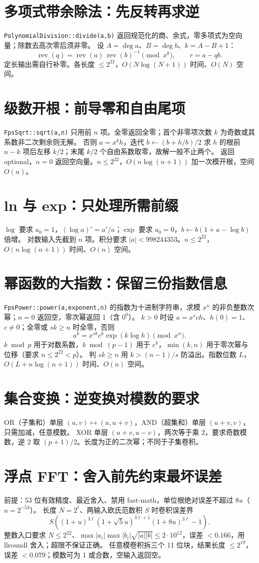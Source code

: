 \section{多项式带余除法：先反转再求逆}\label{knowledge-poly-division}
\texttt{PolynomialDivision::divide(a,b)} 返回规范化的商、余式，零多项式为空向量；除数去高次零后须非零。
设 $A=\deg a$、$B=\deg b$、$k=A-B+1$：
\[
 \operatorname{rev}(q)=\operatorname{rev}(a)\,
 \operatorname{rev}(b)^{-1}\pmod{x^k},\qquad r=a-qb.
\]
定长输出需自行补零。各长度 $\le2^{22}$，$O(N\log(N+1))$ 时间、$O(N)$ 空间。
\section{级数开根：前导零和自由尾项}\label{knowledge-poly-sqrt}
\texttt{FpsSqrt::sqrt(a,n)} 只用前 $n$ 项。全零返回全零；首个非零项次数 $k$ 为奇数或其系数非二次剩余则无解。
否则 $a=x^kh$，迭代 $b\gets(b+h/b)/2$ 求 $h$ 的根前 $n-k$ 项后左移 $k/2$；末尾 $k/2$ 个自由系数取零，故解一般不止两个。
返回 optional，$n=0$ 返回空向量。$n\le2^{22}$，$O(n\log(n+1))$ 加一次模开根，空间 $O(n)$。
\section{ln 与 exp：只处理所需前缀}\label{knowledge-poly-ln-exp}
$\log$ 要求 $a_0=1$，$(\log a)'=a'/a$；$\exp$ 要求 $a_0=0$，$b\gets b(1+a-\log b)$ 倍增。
对数输入先截到 $n$ 项。积分要求 $|a|<998244353$。$n\le2^{22}$，$O(n\log(n+1))$ 时间、$O(n)$ 空间。
\section{幂函数的大指数：保留三份指数信息}\label{knowledge-poly-power}
\texttt{FpsPower::power(a,exponent,n)} 的指数为十进制字符串，求模 $x^n$ 的非负整数次幂；$n=0$ 返回空，零次幂返回 1（含 $0^0$）。
$k>0$ 时设 $a=x^sch$、$h(0)=1$、$c\ne0$；全零或 $sk\ge n$ 时全零，否则
\[
 a^k=x^{sk}c^k\exp(k\log h)\pmod{x^n}.
\]
$k\bmod p$ 用于对数系数，$k\bmod(p-1)$ 用于 $c^k$，$\min(k,n)$ 用于零次幂与位移（要求 $n\le2^{22}<p$）。
判 $sk\ge n$ 用 $k>(n-1)/s$ 防溢出。指数位数 $L$，$O(L+n\log(n+1))$ 时间、$O(n)$ 空间。
\section{集合变换：逆变换对模数的要求}\label{knowledge-fwt-inverse}
OR（子集和）单层 $(u,v)\mapsto(u,u+v)$，AND（超集和）单层 $(u+v,v)$，只需加减，任意模数。
XOR 单层 $(u+v,u-v)$，两次等于乘 2，要求奇数模数，逆 2 取 $(p+1)/2$。长度为正的二次幂；不同于子集卷积。
\section{浮点 FFT：舍入前先约束最坏误差}\label{knowledge-float-fft}
前提：53 位有效精度、最近舍入、禁用 fast-math，单位根绝对误差不超过 $8u$（$u=2^{-53}$）。
长度 $N=2^\ell$、两输入欧氏范数积 $S$ 时卷积误差界
\[
 S\left((1+u)^{3\ell}(1+\sqrt5u)^{3\ell+1}
 (1+8u)^{3\ell}-1\right).
\]
整数入口要求 $N\le2^{22}$、$\max|a_i|\max|b_i|\sqrt{|a||b|}\le2\cdot10^{12}$，误差 $<0.166$，用 llroundl 舍入；超限不保证正确。
任意模卷积拆三个 11 位块，结果长度 $\le2^{19}$，误差 $<0.079$；模数可为 1 或合数，空输入返回空。
